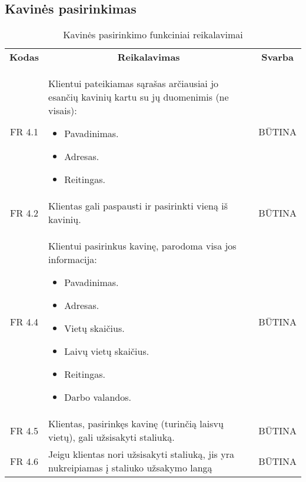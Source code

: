 \documentclass{VUMIFPSkursinis}
\begin{document}
\subsection{Kavinės pasirinkimas}

\begin{center}
	\begin{table}[H]
	\begin{tabular}{|p{2cm}|p{}|p{}|}
	
	\hline
	    \rowcolor{lightgray}
		\multicolumn{3}{|c|}{Kavinės pasirinkimas}\\
		
	\hline
		\multicolumn{1}{|c|}{{\bfseries Kodas}}&
		\multicolumn{1}{|c|}{{\bfseries Reikalavimas}}&
		\multicolumn{1}{|c|}{{\bfseries Svarba}}\\

	\hline
	
		\multicolumn{1}{|c|}{FR 4.1}&
		{Klientui pateikiamas sąrašas arčiausiai jo esančių kavinių kartu su jų duomenimis (ne visais):
		\begin{itemize}
			\item Pavadinimas.
			\item Adresas.
			\item Reitingas.
		\end{itemize}}&
		\multicolumn{1}{|c|}{BŪTINA}\\	
		
	\hline
	
		\multicolumn{1}{|c|}{FR 4.2}&
		{Klientas gali paspausti ir pasirinkti vieną iš kavinių.}&
		\multicolumn{1}{|c|}{BŪTINA}\\
		
	\hline
	
		\multicolumn{1}{|c|}{FR 4.4}&
		{Klientui pasirinkus kavinę, parodoma visa jos informacija:
		\begin{itemize}
			\item Pavadinimas.
			\item Adresas.
			\item Vietų skaičius.
			\item Laivų vietų skaičius.
			\item Reitingas.
			\item Darbo valandos.
		\end{itemize}}&
		\multicolumn{1}{|c|}{BŪTINA}\\
		
	\hline
	
		\multicolumn{1}{|c|}{FR 4.5}&
		{Klientas, pasirinkęs kavinę (turinčią laisvų vietų), gali užsisakyti staliuką.}&
		\multicolumn{1}{|c|}{BŪTINA}\\
	\hline
	
		\multicolumn{1}{|c|}{FR 4.6}&
		{Jeigu klientas nori užsisakyti staliuką, jis yra nukreipiamas į staliuko užsakymo langą}&
		\multicolumn{1}{|c|}{BŪTINA}\\				
	\hline
	
	\end{tabular}		
	\caption{Kavinės pasirinkimo funkciniai reikalavimai}
	\label{table:KavinėsPasirinkimas}
	\end{table}


\end{center}
\end{document}
